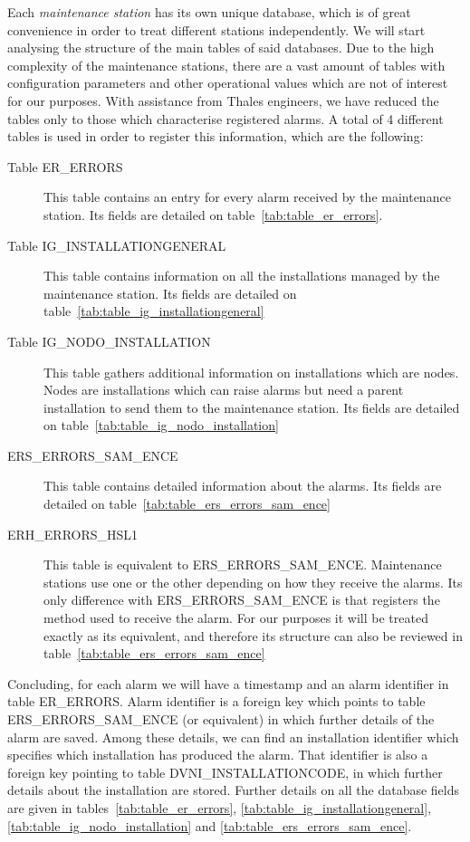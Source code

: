 \documentclass[a4paper,12pt]{article}
\begin{document}
Each \emph{maintenance station} has its own unique database, which is of great convenience in order to treat different stations independently. We will start analysing the structure of the main tables of said databases. Due to the high complexity of the maintenance stations, there are a vast amount of tables with configuration parameters and other operational values which are not of interest for our purposes. With assistance from Thales engineers, we have reduced the tables only to those which characterise registered alarms. A total of 4 different tables is used in order to register this information, which are the following:

\begin{description}
\item[Table ER\_ERRORS] This table contains an entry for every alarm received by the maintenance station. Its fields are detailed on table~\ref{tab:table_er_errors}.
\item[Table IG\_INSTALLATIONGENERAL] This table contains information on all the installations managed by the maintenance station. Its fields are detailed on table~\ref{tab:table_ig_installationgeneral}
\item[Table IG\_NODO\_INSTALLATION] This table gathers additional information on installations which are nodes. Nodes are installations which can raise alarms but need a parent installation to send them to the maintenance station. Its fields are detailed on table~\ref{tab:table_ig_nodo_installation}
\item[ERS\_ERRORS\_SAM\_ENCE] This table contains detailed information about the alarms. Its fields are detailed on table~\ref{tab:table_ers_errors_sam_ence}
\item[ERH\_ERRORS\_HSL1] This table is equivalent to ERS\_ERRORS\_SAM\_ENCE. Maintenance stations use one or the other depending on how they receive the alarms. Its only difference with ERS\_ERRORS\_SAM\_ENCE is that registers the method used to receive the alarm. For our purposes it will be treated exactly as its equivalent, and therefore its structure can also be reviewed in table~\ref{tab:table_ers_errors_sam_ence}
\end{description}

Concluding, for each alarm we will have a timestamp and an alarm identifier in table ER\_ERRORS. Alarm identifier is a foreign key which points to table ERS\_ERRORS\_SAM\_ENCE (or equivalent) in which further details of the alarm are saved. Among these details, we can find an installation identifier which specifies which installation has produced the alarm. That identifier is also a foreign key pointing to table DVNI\_INSTALLATIONCODE, in which further details about the installation are stored. Further details on all the database fields are given in tables~\ref{tab:table_er_errors}, \ref{tab:table_ig_installationgeneral}, \ref{tab:table_ig_nodo_installation} and \ref{tab:table_ers_errors_sam_ence}.
\end{document}
